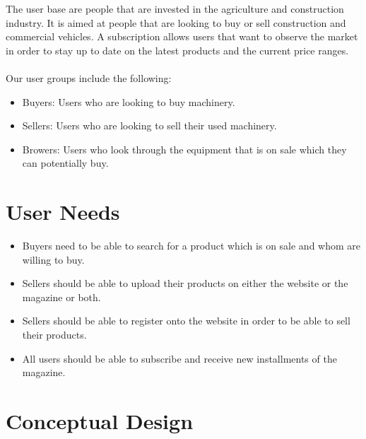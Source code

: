 \documentclass[12pt]{article}
\begin{document}
The user base are people that are invested in the agriculture and construction industry. It is aimed at people that are looking to buy or sell construction and commercial vehicles. A subscription allows users that want to observe the market in order to stay up to date on the latest products and the current price ranges.
\\ \\
Our user groups include the following:

\begin{itemize}
	\item Buyers: Users who are looking to buy machinery.
	\item Sellers: Users who are looking to sell their used machinery.
	\item Browers: Users who look through the equipment that is on sale which they can potentially buy.
\end{itemize}


\section{User Needs}

\begin{itemize}
	\item Buyers need to be able to search for a product which is on sale and whom are willing to buy.
	\item Sellers should be able to upload their products on either the website or the magazine or both.
	\item Sellers should be able to register onto the website in order to be able to sell their products.
	\item All users should be able to subscribe and receive new installments of the magazine.
\end{itemize}

\section{Conceptual Design}
\end{document}
